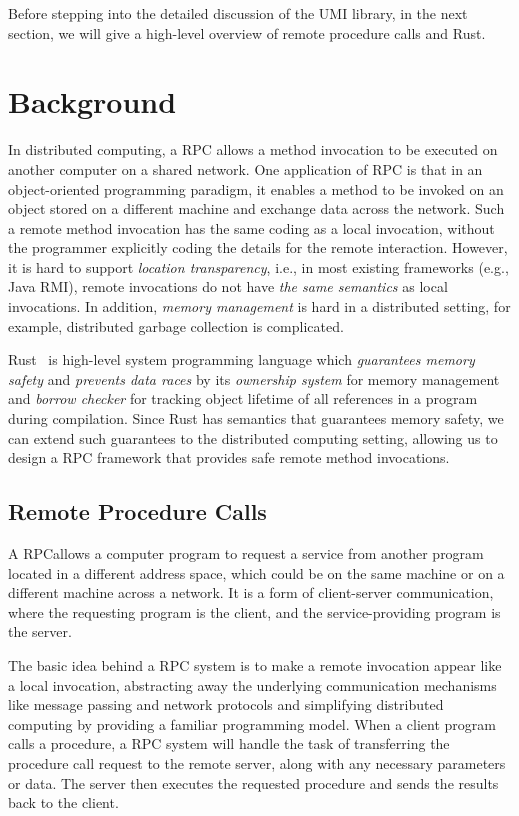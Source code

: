 Before stepping into the detailed discussion of the UMI library, in the next section, we will give a high-level overview of remote procedure calls and Rust.

\section{Background}
\label{chap3:background}
In distributed computing, a RPC allows a method invocation to be executed on another computer on a shared network. One application of RPC is that in an object-oriented programming paradigm, it enables a method to be invoked on an object stored on a different machine and exchange data across the network. Such a remote method invocation has the same coding as a local invocation, without the programmer explicitly coding the details for the remote interaction.
However, it is hard to support \emph{location transparency}, i.e., in most existing frameworks (e.g., Java RMI), remote invocations do not have \emph{the same semantics} as local invocations. In addition, \emph{memory management} is hard in a distributed setting, for example, distributed garbage collection is complicated.

Rust~\citep{10.5555/3271463} is high-level system programming language which \emph{guarantees memory safety} and \emph{prevents data races} by its \emph{ownership system} for memory management and \emph{borrow checker} for tracking object lifetime of all references in a program during compilation.
Since Rust has semantics that guarantees memory safety, we can extend such guarantees to the distributed computing setting, allowing us to design a RPC framework that provides safe remote method invocations.

\subsection{Remote Procedure Calls}
\label{chap3:background:rpc}
A RPCallows a computer program to request a service from another program located in a different address space, which could be on the same machine or on a different machine across a network. It is a form of client-server communication, where the requesting program is the client, and the service-providing program is the server.

The basic idea behind a RPC system is to make a remote invocation appear like a local invocation, abstracting away the underlying communication mechanisms like message passing and network protocols and simplifying distributed computing by providing a familiar programming model. When a client program calls a procedure, a RPC system will handle the task of transferring the procedure call request to the remote server, along with any necessary parameters or data. The server then executes the requested procedure and sends the results back to the client.

